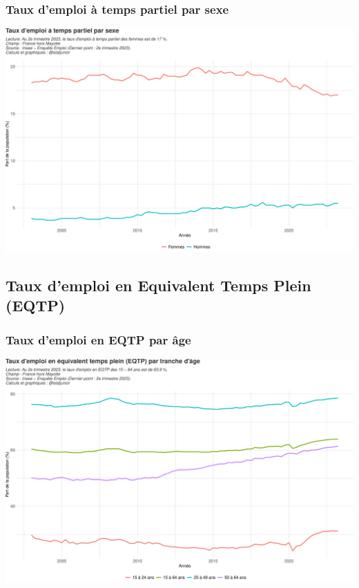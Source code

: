 \documentclass[
  paper=a4,
  ,captions=tableheading
]{scrartcl}
\begin{document}
\hypertarget{taux-demploi-uxe0-temps-partiel-par-sexe}{%
\subsubsection{Taux d'emploi à temps partiel par
sexe}\label{taux-demploi-uxe0-temps-partiel-par-sexe}}

\includegraphics{rapport_activite_emploi_chomage_insee_files/figure-latex/unnamed-chunk-9-1.pdf}

\hypertarget{taux-demploi-en-equivalent-temps-plein-eqtp}{%
\subsection{Taux d'emploi en Equivalent Temps Plein
(EQTP)}\label{taux-demploi-en-equivalent-temps-plein-eqtp}}

\hypertarget{taux-demploi-en-eqtp-par-uxe2ge}{%
\subsubsection{Taux d'emploi en EQTP par
âge}\label{taux-demploi-en-eqtp-par-uxe2ge}}

\includegraphics{rapport_activite_emploi_chomage_insee_files/figure-latex/unnamed-chunk-10-1.pdf}
\end{document}
